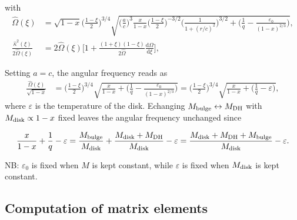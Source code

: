 \documentclass[11pt]{article}
\newcommand{\rd}{\mathrm{d}}
\newcommand{\Mb}{M_{\rm{bulge}}}
\newcommand{\Md}{M_{\rm{disk}}}
\newcommand{\Mdh}{M_{\rm{DH}}}
\newcommand{\hOmega}{\widehat{\Omega}}
\newcommand{\hkappa}{\widehat{\kappa}}
\begin{document}
with
\begin{align}
\hOmega(\xi) &=\sqrt{1-x}\bigg(\frac{1-\xi}{2}\bigg)^{3/4}  \sqrt{\bigg( \frac{a}{c}\bigg)^3\frac{x}{1-x} \bigg(\frac{1-\xi}{2}\bigg)^{-3/2} \bigg(\frac{1}{1+(r/c)^2}\bigg)^{3/2} 
+   \bigg(\frac{1}{q}-  \frac{\varepsilon_0}{ (1-x)^{2/3}} \bigg) } , \\
\frac{\hkappa^2(\xi)}{2\hOmega(\xi)} & = 2\hOmega(\xi) \bigg[1+\frac{(1+\xi)(1-\xi)}{2\hOmega}\frac{\rd \hOmega }{\rd \xi} \bigg],
\end{align}




Setting $a=c$, the angular frequency reads as
\begin{align}
\frac{\hOmega(\xi)}{\sqrt{1-x}} &=\bigg(\frac{1-\xi}{2}\bigg)^{3/4}  \sqrt{\frac{x}{1-x} +   \bigg(\frac{1}{q}-  \frac{\varepsilon_0}{ (1-x)^{2/3}} \bigg) }=\bigg(\frac{1-\xi}{2}\bigg)^{3/4}  \sqrt{\frac{x}{1-x} +   \bigg(\frac{1}{q}-  \varepsilon \bigg) } ,
\end{align}
where $\varepsilon$ is the temperature of the disk. Echanging $\Mb \leftrightarrow \Mdh$ with $\Md \propto 1-x$ fixed leaves the angular frequency unchanged since

$$\frac{x}{1-x} +\frac{1}{q}-  \varepsilon = \frac{\Mb}{\Md} + \frac{\Md+\Mdh}{\Md} - \varepsilon= \frac{\Md+\Mdh+\Mb}{\Md} - \varepsilon. $$

NB: $\varepsilon_0$ is fixed when $M$ is kept constant, while $\varepsilon$ is fixed when $\Md$ is kept constant.

\subsection{Computation of matrix elements}
\end{document}
